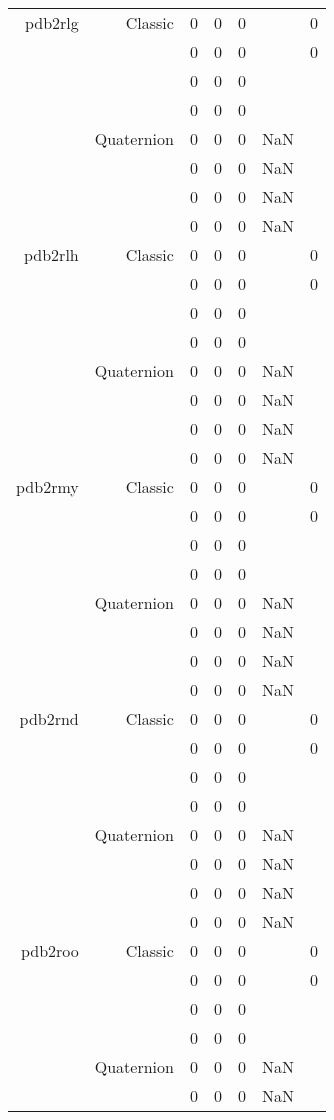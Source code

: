 \begin{xltabular}{\textwidth}{r|rcccSc}
pdb2rlg & Classic & 0 & 0 & 0 & & 0 \\
& & 0 & 0 & 0 & & 0 \\
& & 0 & 0 & 0 & & \\
& & 0 & 0 & 0 & & \\
& Quaternion & 0 & 0 & 0 & NaN & \\
& & 0 & 0 & 0 & NaN & \\
& & 0 & 0 & 0 & NaN & \\
& & 0 & 0 & 0 & NaN & \\ \addlinespace
pdb2rlh & Classic & 0 & 0 & 0 & & 0 \\
& & 0 & 0 & 0 & & 0 \\
& & 0 & 0 & 0 & & \\
& & 0 & 0 & 0 & & \\
& Quaternion & 0 & 0 & 0 & NaN & \\
& & 0 & 0 & 0 & NaN & \\
& & 0 & 0 & 0 & NaN & \\
& & 0 & 0 & 0 & NaN & \\ \addlinespace
pdb2rmy & Classic & 0 & 0 & 0 & & 0 \\
& & 0 & 0 & 0 & & 0 \\
& & 0 & 0 & 0 & & \\
& & 0 & 0 & 0 & & \\
& Quaternion & 0 & 0 & 0 & NaN & \\
& & 0 & 0 & 0 & NaN & \\
& & 0 & 0 & 0 & NaN & \\
& & 0 & 0 & 0 & NaN & \\ \addlinespace
pdb2rnd & Classic & 0 & 0 & 0 & & 0 \\
& & 0 & 0 & 0 & & 0 \\
& & 0 & 0 & 0 & & \\
& & 0 & 0 & 0 & & \\
& Quaternion & 0 & 0 & 0 & NaN & \\
& & 0 & 0 & 0 & NaN & \\
& & 0 & 0 & 0 & NaN & \\
& & 0 & 0 & 0 & NaN & \\ \addlinespace
pdb2roo & Classic & 0 & 0 & 0 & & 0 \\
& & 0 & 0 & 0 & & 0 \\
& & 0 & 0 & 0 & & \\
& & 0 & 0 & 0 & & \\
& Quaternion & 0 & 0 & 0 & NaN & \\
& & 0 & 0 & 0 & NaN & \\

\end{xltabular}
